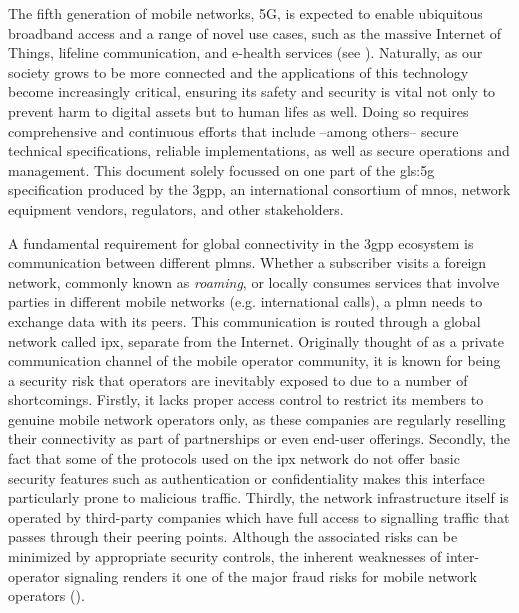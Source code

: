 The fifth generation of mobile networks, 5G, is expected to enable ubiquitous broadband access and a range of novel use cases, such as the massive Internet of Things, lifeline communication, and e-health services (see \cite{ngmn5Gwhite}).
Naturally, as our society grows to be more connected and the applications of this technology become increasingly critical, ensuring its safety and security is vital not only to prevent harm to digital assets but to human lifes as well.
Doing so requires comprehensive and continuous efforts that include --among others-- secure technical specifications, reliable implementations, as well as secure operations and management.
This document solely focussed on one part of the \gls{gls:5g} specification produced by the \gls{3gpp}, an international consortium of \glspl{mno}, network equipment vendors, regulators, and other stakeholders.

A fundamental requirement for global connectivity in the \gls{3gpp} ecosystem is communication between different \glspl{plmn}.
Whether a subscriber visits a foreign network, commonly known as \textit{roaming}, or locally consumes services that involve parties in different mobile networks (e.g. international calls), a \gls{plmn} needs to exchange data with its peers.
This communication is routed through a global network called \gls{ipx}, separate from the Internet.
Originally thought of as a private communication channel of the mobile operator community, it is known for being a security risk that operators are inevitably exposed to due to a number of shortcomings.
Firstly, it lacks proper access control to restrict its members to genuine mobile network operators only, as these companies are regularly reselling their connectivity as part of partnerships or even end-user offerings.
Secondly, the fact that some of the protocols used on the \gls{ipx} network do not offer basic security features such as authentication or confidentiality makes this interface particularly prone to malicious traffic.
Thirdly, the network infrastructure itself is operated by third-party companies which have full access to signalling traffic that passes through their peering points.
Although the associated risks can be minimized by appropriate security controls, the inherent weaknesses of inter-operator signaling renders it one of the major fraud risks for mobile network operators (\cite{sahin2017sok}).

